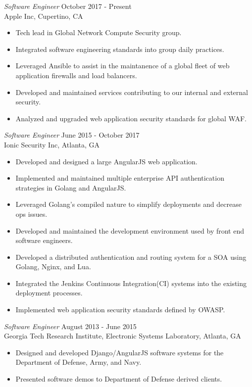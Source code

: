 \documentclass[margin, 10pt]{res} %
\begin{document}
\begin{resume}
        {\sl Software Engineer} \hfill October 2017 - Present \\
        Apple Inc, Cupertino, CA
        \begin{itemize}
            \item Tech lead in Global Network Compute Security group.
            \item Integrated software engineering standards into group daily practices.
            \item Leveraged Ansible to assist in the maintanence of a global fleet of web application firewalls and load balancers.
            \item Developed and maintained services contributing to our internal and external security.
            \item Analyzed and upgraded web application security standards for global WAF.
        \end{itemize}

        {\sl Software Engineer} \hfill June 2015 - October 2017 \\
        Ionic Security Inc, Atlanta, GA
        \begin{itemize}
            \item Developed and designed a large AngularJS web application.
            \item Implemented and maintained multiple enterprise API authentication strategies in Golang and AngularJS.
            \item Leveraged Golang's compiled nature to simplify deployments and decrease ops issues.
            \item Developed and maintained the development environment used by front end software engineers.
            \item Developed a distributed authentication and routing system for a SOA using Golang, Nginx, and Lua.
            \item Integrated the Jenkins Continuous Integration(CI) systems into the existing deployment processes.
            \item Implemented web application security standards defined by OWASP.
        \end{itemize}

        {\sl Software Engineer} \hfill August 2013 - June 2015 \\
        Georgia Tech Research Institute, Electronic Systems Laboratory, Atlanta, GA
        \begin{itemize} \itemsep -2pt %
        \item Designed and developed Django/AngularJS software systems for the Department of Defense, Army, and Navy.
        \item Presented software demos to Department of Defense derived clients.
        \end{itemize}


\end{resume}
\end{document}
